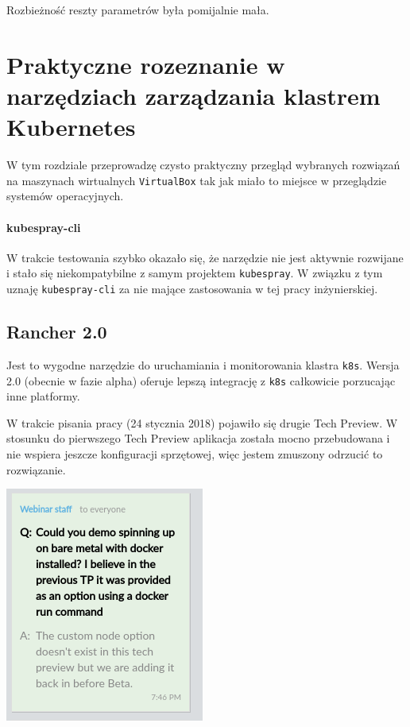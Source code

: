 \documentclass[a4paper,12pt,twoside,openany]{report}
\newcommand{\passthrough}[1]{#1}
\begin{document}
Rozbieżność reszty parametrów była pomijalnie mała.

\hypertarget{praktyczne-rozeznanie-w-narzux119dziach-zarzux105dzania-klastrem-kubernetes}{%
\chapter{Praktyczne rozeznanie w narzędziach zarządzania klastrem
Kubernetes}\label{praktyczne-rozeznanie-w-narzux119dziach-zarzux105dzania-klastrem-kubernetes}}

W tym rozdziale przeprowadzę czysto praktyczny przegląd wybranych
rozwiązań na maszynach wirtualnych \passthrough{\lstinline!VirtualBox!}
tak jak miało to miejsce w przeglądzie systemów operacyjnych.

\hypertarget{kubespray-cli}{%
\subsubsection{kubespray-cli}\label{kubespray-cli}}

W trakcie testowania szybko okazało się, że narzędzie nie jest aktywnie
rozwijane i stało się niekompatybilne z samym projektem
\passthrough{\lstinline!kubespray!}. W związku z tym uznaję
\passthrough{\lstinline!kubespray-cli!} za nie mające zastosowania w tej
pracy inżynierskiej.

\hypertarget{rancher-2.0}{%
\section{Rancher 2.0}\label{rancher-2.0}}

Jest to wygodne narzędzie do uruchamiania i monitorowania klastra
\passthrough{\lstinline!k8s!}. Wersja 2.0 (obecnie w fazie alpha)
oferuje lepszą integrację z \passthrough{\lstinline!k8s!} całkowicie
porzucając inne platformy.

W trakcie pisania pracy (24 stycznia 2018) pojawiło się drugie Tech
Preview. W stosunku do pierwszego Tech Preview aplikacja została mocno
przebudowana i nie wspiera jeszcze konfiguracji sprzętowej, więc jestem
zmuszony odrzucić to rozwiązanie.

\includegraphics{assets/rancher-tp2-baremetal.png}\\
\end{document}
